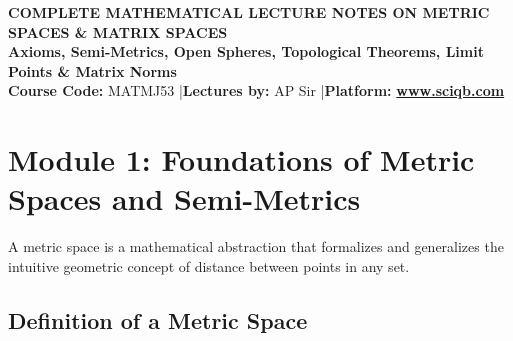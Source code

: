 \documentclass[11pt,a4paper]{article}
\begin{document}
\begin{center}
    \begin{tcolorbox}[sharp corners, boxrule=1.5pt]
        \begin{center}
            {\Large \bfseries \color{primarynavy} COMPLETE MATHEMATICAL LECTURE NOTES ON METRIC SPACES \& MATRIX SPACES}\\[4pt]
            {\large \bfseries \color{secondaryteal} Axioms, Semi-Metrics, Open Spheres, Topological Theorems, Limit Points \& Matrix Norms}\\[6pt]
            {\small \textbf{Course Code:} MATMJ53 \quad|\quad \textbf{Lectures by:} AP Sir \quad|\quad \textbf{Platform:} \href{https://www.sciqb.com}{\color{accentblue}\textbf{www.sciqb.com}}}
        \end{center}
    \end{tcolorbox}
\end{center}

\vspace{0.3cm}

\tableofcontents
\newpage

\section{Module 1: Foundations of Metric Spaces and Semi-Metrics}

A metric space is a mathematical abstraction that formalizes and generalizes the intuitive geometric concept of distance between points in any set.

\subsection{Definition of a Metric Space}
\end{document}
